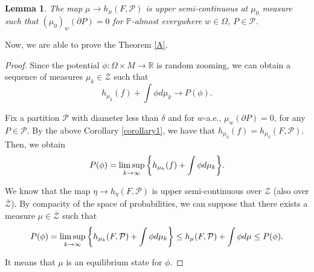 \documentclass[12pt,a4paper]{amsart}
\theoremstyle{plain}
\newtheorem{lemma}{Lemma}
\begin{document}
	\begin{lemma}\cite[Lemma 6.9]{AMO}
		The map $\mu \to h_{\mu}(F,\mathcal{P})$ is upper semi-continuous at $\mu_{0}$ measure such that $(\mu_{0})_{w}(\partial P) = 0$ for $\mathbb{P}$-almost everywhere $w \in \Omega$, $P \in \mathcal{P}$.
	\end{lemma}
	
	Now, we are able to prove the Theorem \ref{A}.
	\begin{proof}
		Since the potential $\phi : \Omega \times M \to \mathbb{R}$ is random zooming, we can obtain a sequence of measures $\mu_{k} \in \mathcal{Z}$ such that
		\[
		h_{\mu_{k}}(f) + \int \phi d\mu_{k} \to P(\phi).
		\]
		
		Fix a partition $\mathcal{P}$ with diameter less than $\delta$ and for $w$-a.e., $\mu_{w}(\partial P) = 0$, for any $P \in \mathcal{P}$. By the above Corollary \ref{corollary1}, we have that $h_{\mu_{k}}(f)=h_{\mu_{k}}(F,\mathcal{P})$. Then, we obtain
		\[
		P(\phi) = \limsup_{k \to \infty} \bigg{\{} h_{\mu_{k}}(f) + \int \phi d\mu_{k}\bigg{\}}.
		\]
		
		We know that the map $\eta \to h_{\eta}(F,\mathcal{P})$ is upper semi-continuous over $\mathcal{Z}$ (also over $\overline{\mathcal{Z}}$). By compacity of the space of probabilities, we can suppose that there exists a measure $\mu \in \overline{\mathcal{Z}}$ such that 
		\[
		P(\phi) = \limsup_{k \to \infty} \bigg{\{} h_{\mu_{k}}(F,\mathcal{P}) + \int \phi d\mu_{k}\bigg{\}} \leq h_{\mu}(F,\mathcal{P}) + \int \phi d\mu \leq P(\phi).
		\]
		
		It means that $\mu$ is an equilibrium state for $\phi$.
	\end{proof}
	
	
	
\end{document}
